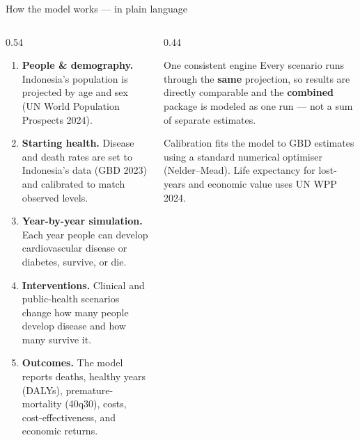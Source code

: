 \documentclass[
  ignorenonframetext,
  aspectratio=169]{beamer}
\begin{document}
\begin{frame}{How the model works --- in plain language}
\label{how-the-model-works-in-plain-language}
\begin{columns}[T]
\begin{column}{0.54\textwidth}
\footnotesize
\begin{enumerate}\itemsep3pt
  \item \textbf{People \& demography.} Indonesia's population is projected by age and sex (UN World Population Prospects 2024).
  \item \textbf{Starting health.} Disease and death rates are set to Indonesia's data (GBD 2023) and calibrated to match observed levels.
  \item \textbf{Year-by-year simulation.} Each year people can develop cardiovascular disease or diabetes, survive, or die.
  \item \textbf{Interventions.} Clinical and public-health scenarios change how many people develop disease and how many survive it.
  \item \textbf{Outcomes.} The model reports deaths, healthy years (DALYs), premature-mortality (40q30), costs, cost-effectiveness, and economic returns.
\end{enumerate}
\end{column}
\begin{column}{0.44\textwidth}
\begin{block}{One consistent engine}
\footnotesize Every scenario runs through the \textbf{same} projection, so results are directly comparable and the \textbf{combined} package is modeled as one run --- not a sum of separate estimates.
\end{block}
\vspace{2pt}
\scriptsize Calibration fits the model to GBD estimates using a standard numerical optimiser (Nelder--Mead). Life expectancy for lost-years and economic value uses UN WPP 2024.
\end{column}
\end{columns}
\end{frame}
\end{document}
